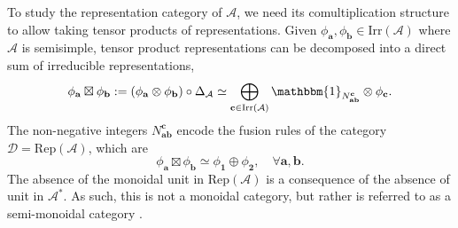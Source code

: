 \documentclass[prx, twocolumn, superscriptaddress, dvipsnames]{revtex4-2}
\theoremstyle{definition}
\newcommand{\bo}{\mathbbm{1}}
\newcommand{\mA}{\mathcal{A}}
\newcommand{\vbnt}{\mathbf{a}}
\begin{document}
To study the representation category of $\mA$, we need its comultiplication structure to allow taking tensor products of representations. Given $\phi_\vbnt,\phi_{\mathbf{b}}\in\text{Irr}(\mA)$ where $\mA$ is semisimple, tensor product representations can be decomposed into a direct sum of irreducible representations,
\begin{equation}
\label{eqn:tensor-prod-rep-main}
    \phi_\vbnt \boxtimes \phi_{\mathbf{b}}:=(\phi_\vbnt\otimes \phi_{\mathbf{b}})\circ\Delta_\mA \simeq \bigoplus_{\mathbf{c}\in\text{Irr}(\mA)} \bo_{N_{\mathbf{ab}}^{\mathbf{c}}} \otimes \phi_{\mathbf{c}}.
\end{equation}
The non-negative integers $N_{\mathbf{ab}}^{\mathbf{c}}$ encode the fusion rules of the category $\mathcal{D}=\text{Rep}(\mA)$, which are
\begin{equation}
\phi_{\mathbf{a}} \boxtimes \phi_{\mathbf{b}} \simeq \phi_{\mathbf{1}} \oplus \phi_{\mathbf{2}}, \quad \forall \mathbf a, \mathbf b.
\end{equation}
The absence of the monoidal unit in $\text{Rep}(\mA)$ is a consequence of the absence of unit in $\mA^*$. As such, this is not a monoidal category, but rather is referred to as a semi-monoidal category \cite{kock2008elementary}.
\end{document}
